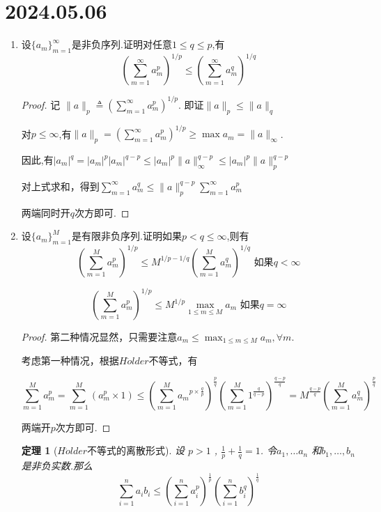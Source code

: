 \documentclass[12pt,a4paper]{article}
\newtheorem{theorem}{定理}
\begin{document}
	
	\noindent
	
	\section*{2024.05.06}	
	
	\begin{enumerate}
		\item 设$\{a_m\}_{m=1}^\infty$是非负序列.证明对任意$1\leq q\leq p$,有
		$$(\sum_{m=1}^\infty a_m^p)^{1/p}\leq(\sum_{m=1}^\infty a_m^q)^{1/q}$$
		
		\begin{proof}
			记 $\|a\|_p\triangleq (\sum_{m=1}^\infty a_m^p)^{1/p}$. 即证$\|a\|_p \leq \|a\|_q$
			
			对$p \leq \infty$,有$\|a\|_p = (\sum_{m=1}^\infty a_m^p)^{1/p} \geq \max a_m = \|a\|_\infty$.
			
			因此,有$|a_m|^q=|a_m|^p|a_m|^{q-p}\leq|a_m|^p  \|a\|_\infty^{q-p} \leq|a_m|^p\|a\|_p^{q-p}$
			
			对上式求和，得到$\sum_{m=1}^\infty a_m^q \leq \|a\|_p^{q-p} \sum_{m=1}^\infty a_m^p$
			
			两端同时开$q$次方即可.
		\end{proof}
		\item 设$\{a_m\}_{m=1}^M$是有限非负序列.证明如果$p<q\leq\infty$,则有
		$$(\sum_{m=1}^Ma_m^p)^{1/p}\leq M^{1/p-1/q}(\sum_{m=1}^Ma_m^q)^{1/q}\text{ 如果}q<\infty$$
		
		$$(\sum_{m=1}^Ma_m^p)^{1/p}\leq M^{1/p}\max_{1\leq m\leq M}a_m\text{ 如果}q=\infty $$
		
		\begin{proof}
			第二种情况显然，只需要注意$a_m \leq \max_{1\leq m\leq M}a_m, \forall m$.
			
			考虑第一种情况，根据$H\ddot{o}lder$不等式，有
			
			$$\sum_{m=1}^M a_m^p = \sum_{m=1}^M (a_m^p \times 1) \leq \left(\sum_{m=1}^M {a_m}^{p\times \frac{q}{p}}\right)^\frac{p}{q} \left(\sum_{m=1}^M 1^{\frac{q}{q-p}}\right)^{\frac{q-p}{q}}=M^{\frac{q-p}{q}} \left(\sum_{m=1}^M a_m^{q}\right)^\frac{p}{q}$$
			
			两端开$p$次方即可.
		\end{proof}
		
		\begin{theorem}[$H\ddot{o}lder$不等式的离散形式]
			设 $p>1$ , $\frac{1}{p}+\frac{1}{q}=1$. 令$a_1,\ldots a_n$ 和$b_1,\ldots,b_n$ 是非负实数.那么
			$$\sum_{i=1}^na_ib_i\leq\left(\sum_{i=1}^na_i^p\right)^{\frac1p}\left(\sum_{i=1}^nb_i^q\right)^{\frac1q}$$
		\end{theorem}
	\end{enumerate}
	
	
\end{document}
